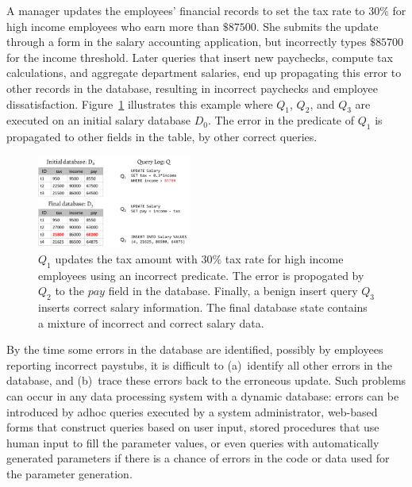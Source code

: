 \begin{example}\label{ex:telco}
  A manager updates the employees' financial records to set the tax rate to $30\%$ for high income employees who earn more than $\$87500$.
  She submits the update through a form in the salary accounting application, 
  but incorrectly types $\$85700$ for the income threshold.  
  Later queries that insert new paychecks, compute tax calculations, and
  aggregate department salaries, end up propagating this error to other records in the database, resulting in incorrect paychecks and
  employee dissatisfaction.  Figure~\ref{fig:example} illustrates this example where $Q_1$, $Q_2$, and $Q_3$ are executed on an 
  initial salary database $D_0$.  The error in the predicate of $Q_1$ is propagated to other fields in the table, by other correct queries.
\end{example}

\begin{figure}[t]
    \centering
        \includegraphics[width=0.45\textwidth]{figures/example2}
    \caption{\small $Q_1$ updates the tax amount with $30\%$ tax rate 
      for high income employees using an incorrect predicate.  
      The error is propogated by $Q_2$ to the $pay$ field in the database.
      Finally, a benign insert query $Q_3$ inserts correct salary information. 
      The final database state contains a mixture of incorrect and correct salary data.
    }
    \vspace*{-.2in}
    \label{fig:example}
\end{figure}


By the time some errors in the database are identified, possibly by
employees reporting incorrect paystubs, it is difficult to
(a)~identify all other errors in the database, and (b)~trace these
errors back to the erroneous update. Such problems can occur in any
data processing system with a dynamic database: errors can be
introduced by adhoc queries executed by a system administrator,
web-based forms that construct queries based on user input, stored
procedures that use human input to fill the parameter values, or even
queries with automatically generated parameters if there is a chance of
errors in the code or data used for the parameter generation.
